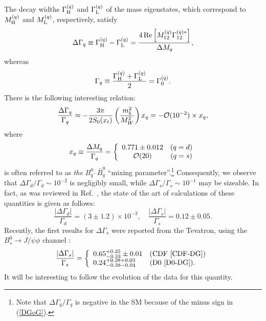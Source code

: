 \documentclass[11pt]{cernrep}
\begin{document}
The decay widths $\Gamma_{\rm H}^{(q)}$ and 
$\Gamma_{\rm L}^{(q)}$ of the mass eigenstates, which correspond to 
$M^{(q)}_{\rm H}$ and $M^{(q)}_{\rm L}$, respectively, satisfy 
\begin{equation}
\Delta\Gamma_q\equiv\Gamma_{\rm H}^{(q)}-\Gamma_{\rm L}^{(q)}=
\frac{4\mbox{\,Re}\left[M_{12}^{(q)}\Gamma_{12}^{(q)\ast}\right]}{\Delta M_q},
\end{equation}
whereas 
\begin{equation}
\Gamma_q\equiv\frac{\Gamma^{(q)}_{\rm H}+\Gamma^{(q)}_{\rm L}}{2}=
\Gamma^{(q)}_0.
\end{equation}
There is the following interesting relation:
\begin{equation}\label{DGoG}
\frac{\Delta\Gamma_q}{\Gamma_q}\approx-\frac{3\pi}{2S_0(x_t)}
\left(\frac{m_b^2}{M_W^2}\right)x_q=-{\cal O}(10^{-2})\times x_q,
\end{equation}
where
\begin{equation}\label{mix-par}
x_q\equiv\frac{\Delta M_q}{\Gamma_q}=\left\{\begin{array}{cc}
0.771\pm0.012&(q=d)\\
{\cal O}(20)& (q=s)
\end{array}\right.
\end{equation}
is often referred to as {\it the} 
$B^0_q$--$\bar B^0_q$ ``mixing parameter''.\footnote{Note that
$\Delta\Gamma_q/\Gamma_q$ is negative in the SM because of the
minus sign in (\ref{DGoG}).}
Consequently, we observe that $\Delta\Gamma_d/\Gamma_d\sim 10^{-2}$ is 
negligibly small, while $\Delta\Gamma_s/\Gamma_s\sim 10^{-1}$ may
be sizeable. In fact, as was reviewed in Ref.~\cite{lenz}, the 
state of the art of calculations of these quantities is given as follows:
\begin{equation}\label{DGam-numbers}
\frac{|\Delta\Gamma_d|}{\Gamma_d}=(3\pm1.2)\times 10^{-3}, \quad
\frac{|\Delta\Gamma_s|}{\Gamma_s}=0.12\pm0.05.
\end{equation}
Recently, the first results for 
$\Delta\Gamma_s$ were reported from the Tevatron, using the 
$B^0_s\to J/\psi\phi$ channel \cite{DDF}:
\begin{equation}
\frac{|\Delta\Gamma_s|}{\Gamma_s}=\left\{
\begin{array}{ll}
0.65^{+0.25}_{-0.33}\pm0.01 & \mbox{(CDF \cite{CDF-DG})}\\
0.24^{+0.28+0.03}_{-0.38-0.04} & \mbox{(D0 \cite{D0-DG})}.
\end{array}
\right.
\end{equation}
It will be interesting to follow the evolution of the data for this quantity. 
\end{document}
